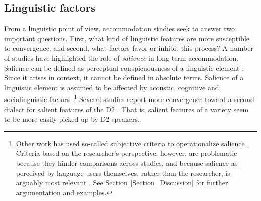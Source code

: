 \documentclass[output=paper,
modfonts
]{langscibook}
\begin{document}
\subsection{Linguistic factors}
From a linguistic point of view, accommodation studies seek to answer two important questions. First, what kind of linguistic features are more susceptible to convergence, and second, what factors favor or inhibit this process?
% 
% 
A number of studies have highlighted the role of \textit{salience} in long-term accommodation. Salience can be defined as perceptual conspicuousness of a linguistic element \citep{lenz_zum_2010}. Since it arises in context, it cannot be defined in absolute terms.  Salience of a linguistic element is assumed to be affected by acoustic, cognitive and sociolinguistic factors \citep{auer_anmerkungen_2014}.\footnote{Other work has used so-called subjective criteria to operationalize salience \citep[see examples reviewed in][]{wilson_types_2011,macleod_critical_2015}. Criteria based on the researcher's perspective, however, are problematic because they hinder comparisons across studies, and because salience as perceived by language users themselves, rather than the researcher, is arguably most relevant \citep[see]{macleod_critical_2015}. See Section \ref{Section_Discussion} for further argumentation and examples.}
% 
% 
% 
%
Several studies report more convergence toward a second dialect for salient features of the D2 \citep{auer_subjective_1998,pesqueira_cambio_2008,wilson_types_2011,romera_prosodic_2013}. That is, salient features of a variety seem to be more easily picked up by D2 speakers. 
\end{document}
